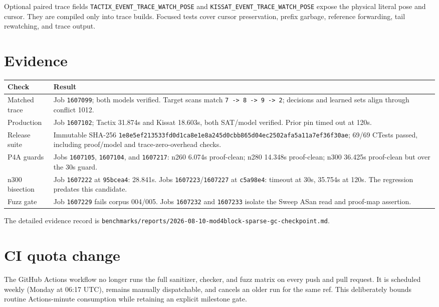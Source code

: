 \documentclass[11pt]{article}
\newcommand{\code}[1]{\nolinkurl{#1}}
\newcommand{\tactix}{Tactix}
\newcommand{\kissat}{Kissat}
\begin{document}
Optional paired trace fields
\code{TACTIX_EVENT_TRACE_WATCH_POSE} and
\code{KISSAT_EVENT_TRACE_WATCH_POSE} expose the physical literal pose and
cursor. They are compiled only into trace builds. Focused tests cover cursor
preservation, prefix garbage, reference forwarding, tail rewatching, and trace
output.

\section{Evidence}

\begin{center}
\small
\begin{tabular}{p{}p{}}
\toprule
Check & Result \\
\midrule
Matched trace & Job \code{1607099}; both models verified. Target scans match
\code{7 -> 8 -> 9 -> 2}; decisions and learned sets align through conflict
1012. \\
Production & Job \code{1607102}; \tactix{} 31.874s and \kissat{} 18.603s,
both SAT/model verified. Prior pin timed out at 120s. \\
Release suite & Immutable SHA-256
\code{1e8e5ef213533fd0d1ca8e1e8a245d0cbb865d04ec2502afa5a11a7ef36f30ae};
69/69 CTests passed, including proof/model and trace-zero-overhead checks. \\
P4A guards & Jobs \code{1607105}, \code{1607104}, and \code{1607217}: n260
6.074s proof-clean; n280 14.348s proof-clean; n300 36.425s proof-clean but over
the 30s guard. \\
n300 bisection & Job \code{1607222} at \code{95bcea4}: 28.841s. Jobs
\code{1607223}/\code{1607227} at \code{c5a98e4}: timeout at 30s, 35.754s at
120s. The regression predates this candidate. \\
Fuzz gate & Job \code{1607229} fails corpus 004/005. Jobs \code{1607232} and
\code{1607233} isolate the Sweep ASan read and proof-map assertion. \\
\bottomrule
\end{tabular}
\end{center}

The detailed evidence record is
\code{benchmarks/reports/2026-08-10-mod4block-sparse-gc-checkpoint.md}.

\section{CI quota change}

The GitHub Actions workflow no longer runs the full sanitizer, checker, and
fuzz matrix on every push and pull request. It is scheduled weekly (Monday at
06:17 UTC), remains manually dispatchable, and cancels an older run for the
same ref. This deliberately bounds routine Actions-minute consumption while
retaining an explicit milestone gate.
\end{document}
